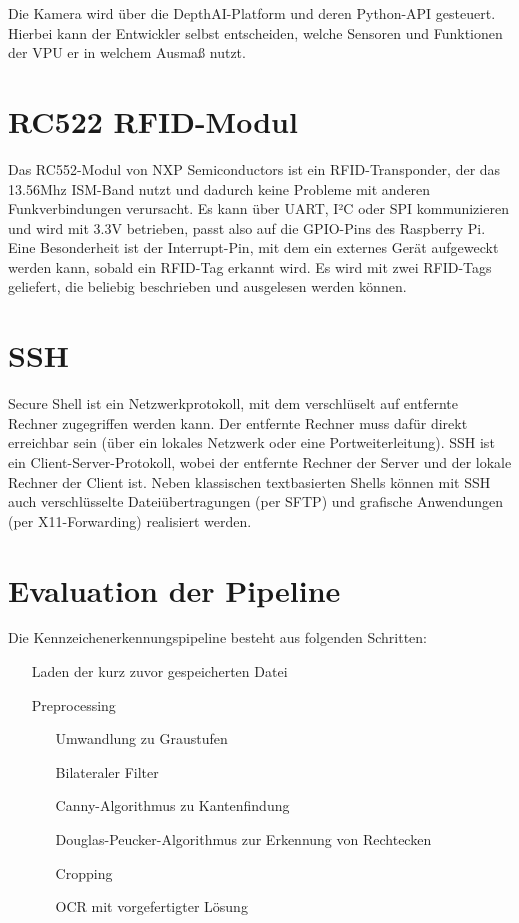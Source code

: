 Die Kamera wird über die DepthAI-Platform und deren Python-API gesteuert. Hierbei kann der Entwickler selbst entscheiden, welche Sensoren und Funktionen der VPU er in welchem Ausmaß nutzt.

\chapter{RC522 RFID-Modul}

Das RC552-Modul von NXP Semiconductors ist ein RFID-Transponder, der das 13.56Mhz ISM-Band nutzt und dadurch keine Probleme mit anderen Funkverbindungen verursacht. Es kann über UART, I²C oder SPI kommunizieren und wird mit 3.3V betrieben, passt also auf die GPIO-Pins des Raspberry Pi. Eine Besonderheit ist der Interrupt-Pin, mit dem ein externes Gerät aufgeweckt werden kann, sobald ein RFID-Tag erkannt wird. Es wird mit zwei RFID-Tags geliefert, die beliebig beschrieben und ausgelesen werden können. 

\chapter{SSH}

Secure Shell ist ein Netzwerkprotokoll, mit dem verschlüselt auf entfernte Rechner zugegriffen werden kann. Der entfernte Rechner muss dafür direkt erreichbar sein (über ein lokales Netzwerk oder eine Portweiterleitung).
SSH ist ein Client-Server-Protokoll, wobei der entfernte Rechner der Server und der lokale Rechner der Client ist. Neben klassischen textbasierten Shells können mit SSH auch verschlüsselte Dateiübertragungen (per SFTP) und grafische Anwendungen (per X11-Forwarding) realisiert werden.


\chapter{Evaluation der Pipeline}

Die Kennzeichenerkennungspipeline besteht aus folgenden Schritten:
\begin{itemize}
    \item[Laden der kurz zuvor gespeicherten Datei]
    \item[Preprocessing]
    \begin{itemize}
        \item[Umwandlung zu Graustufen]
        \item[Bilateraler Filter]
        \item[Canny-Algorithmus zu Kantenfindung]
        \item[Douglas-Peucker-Algorithmus zur Erkennung von Rechtecken]
        \item[Cropping]
        \item[OCR mit vorgefertigter Lösung]
    \end{itemize}
\end{itemize}

